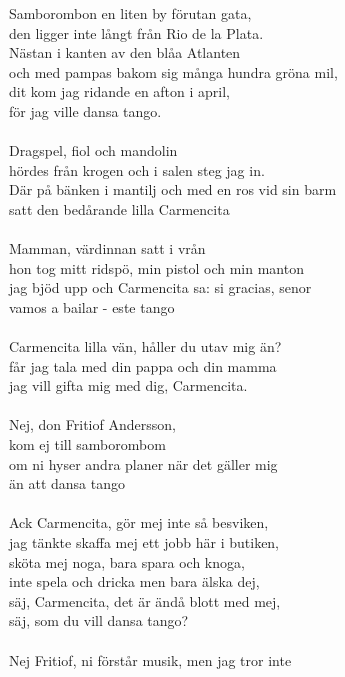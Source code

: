 \vspace{10pt}
Samborombon en liten by förutan gata,\\
den ligger inte långt från Rio de la Plata.\\
Nästan i kanten av den blåa Atlanten\\
och med pampas bakom sig många hundra gröna mil,\\
dit kom jag ridande en afton i april,\\
för jag ville dansa tango.\\
\\
Dragspel, fiol och mandolin\\
hördes från krogen och i salen steg jag in.\\
Där på bänken i mantilj och med en ros vid sin barm\\
satt den bedårande lilla Carmencita\\
\\
Mamman, värdinnan satt i vrån\\
hon tog mitt ridspö, min pistol och min manton\\
jag bjöd upp och Carmencita sa: si gracias, senor\\
vamos a bailar - este tango\\
\\
Carmencita lilla vän, håller du utav mig än?\\
får jag tala med din pappa och din mamma\\
jag vill gifta mig med dig, Carmencita.\\
\\
Nej, don Fritiof Andersson,\\
kom ej till samborombom\\
om ni hyser andra planer när det gäller mig\\
än att dansa tango\\
\\
Ack Carmencita, gör mej inte så besviken,\\
jag tänkte skaffa mej ett jobb här i butiken,\\
sköta mej noga, bara spara och knoga,\\
inte spela och dricka men bara älska dej,\\
säj, Carmencita, det är ändå blott med mej,\\
säj, som du vill dansa tango?\\
\\
Nej Fritiof, ni förstår musik, men jag tror inte\\
